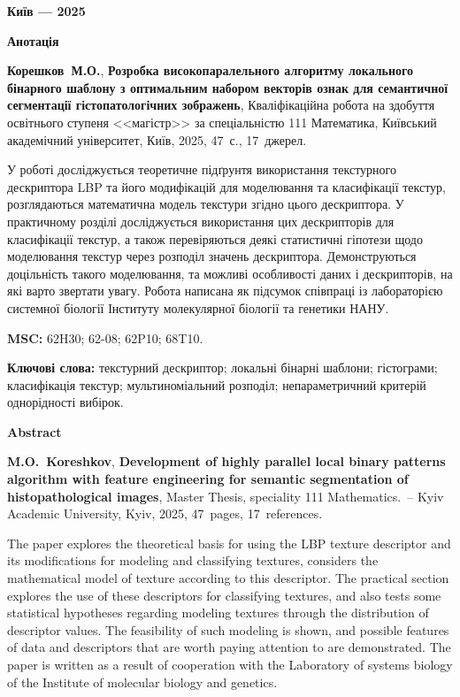 \documentclass{thesis}
\newcommand{\MyInitialName}{Корешков~М.О.}
\newcommand{\ThesisName}{Розробка високопаралельного алгоритму локального бінарного шаблону з оптимальним набором векторів ознак для семантичної сегментації гістопатологічних зображень}
\newcommand{\NumPages}{47}
\newcommand{\NumCitations}{17}
\newcommand{\MyReverseInitialNameEn}{M.O.~Koreshkov}
\newcommand{\ThesisNameEn}{Development of highly parallel local binary patterns algorithm with feature engineering for semantic segmentation of histopathological images}
\newcommand{\MSC}{62H30; 62-08; 62P10; 68T10.}
\newcommand{\1}{\mathbb 1}
\begin{document}
\vfill

\centerline{\bf Київ --- 2025}

\newpage

\begin{center}
\Large \bf Анотація
\end{center}

\noindent
\textbf{\MyInitialName}, \textbf{\ThesisName}, Кваліфікаційна робота на здобуття освітнього ступеня <<магістр>> за спеціальністю 111 Математика, Київський академічний університет, Київ, 2025, \NumPages~с., \NumCitations~джерел.

\bigskip


{ У роботі досліджується теоретичне підґрунтя використання текстурного дескриптора LBP та його модифікацій для моделювання та класифікації текстур, 
розглядаються математична модель текстури згідно цього дескриптора.
У практичному розділі досліджується використання цих дескрипторів для класифікації текстур, 
а також перевіряються деякі статистичні гіпотези щодо моделювання текстур через розподіл значень дескриптора.
Демонструються доцільність такого моделювання, та можливі особливості даних і дескрипторів, на які варто звертати увагу.
Робота написана як підсумок співпраці із лабораторією системної біології Інституту молекулярної біології та генетики НАНУ.}

\bigskip

\noindent
{\bf MSC:} \MSC

\bigskip

\noindent
{\bf Ключові слова:} текстурний дескриптор; локальні бінарні шаблони; гістограми; класифікація текстур; мультиноміальний розподіл; непараметричний критерій однорідності вибірок.
\bigskip

\newpage

\begin{center}
\Large \bf Abstract
\end{center}

\noindent
\textbf{\MyReverseInitialNameEn}, \textbf{\ThesisNameEn}, Master Thesis, speciality 111 Mathematics.~--
Kyiv Academic University, Kyiv, 2025, \NumPages~pages, \NumCitations~references.

\bigskip
{ The paper explores the theoretical basis for using the LBP texture descriptor and its modifications for modeling and classifying textures,
considers the mathematical model of texture according to this descriptor.
The practical section explores the use of these descriptors for classifying textures,
and also tests some statistical hypotheses regarding modeling textures through the distribution of descriptor values.
The feasibility of such modeling is shown, and possible features of data and descriptors that are worth paying attention to are demonstrated.
The paper is written as a result of cooperation with the Laboratory of systems biology of the Institute of molecular biology and genetics.}
\end{document}
